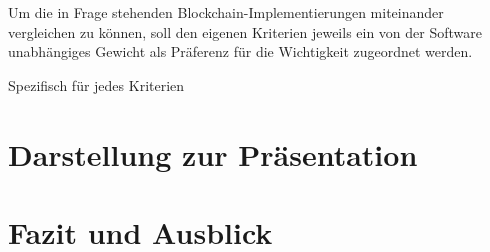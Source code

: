 \documentclass[german,12pt,paper=a4,DIV=calc,twoside, openright]{scrreprt}
\newcommand{\quellenHinweistext}{Online aufgefundene Quellen wurden via \href{https://archive.org/}{archive.org} gesichert und umfangreiche Werke bei Abgabe auf dem Datenträger beigelegt.}
\begin{document}
Um die in Frage stehenden Blockchain-Implementierungen miteinander vergleichen zu können,
soll den eigenen Kriterien jeweils ein von der Software unabhängiges Gewicht als Präferenz für die Wichtigkeit zugeordnet werden.

Spezifisch für jedes Kriterien 
  
\chapter{Darstellung zur Präsentation}



\chapter{Fazit und Ausblick}
\cleardoublepage 



\printbibliography[title={Quellennachweise%
}]
\cleardoublepage 

\appendix




\hspace{1mm}\,\vspace{3em}
\label{apx:ee}

\clearpage
\end{document}
